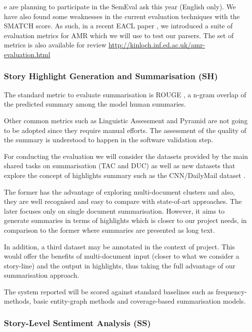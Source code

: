 e are  planning to participate in the SemEval ask this year (English only).
We have also found some weaknesses in the current evaluation techniques with the SMATCH score. As such, in a recent EACL paper \citep{damonte-17}, we introduced a suite of evaluation metrics for AMR which we will use to test our parsers. The set of metrics is also available for review 
\url{http://kinloch.inf.ed.ac.uk/amr-evaluation.html}

\subsubsection{Story Highlight Generation and Summarisation (SH)}

The standard metric to evaluate summarisation is ROUGE \citep{Lin04ROUGE}, a n-gram overlap of the predicted summary among the model human summaries.

Other common metrics such as Linguistic Assessment and Pyramid \citep{Nenkova07Pyramid} are not going to be adopted since they require manual efforts. The assessment of the quality of the summary is understood to happen in the software validation step.

For conducting the evaluation we will consider the datasets provided by the main shared tasks on summarisation (TAC and DUC) as well as new datasets that explore the concept of highlights summary such as the CNN/DailyMail dataset \citep{ChengLapata16Neural}.

The former has the advantage of exploring multi-document clusters and also, they are well recognised and easy to compare with state-of-art approaches. The later focuses only on single document summarisation. However, it aims to generate summaries in terms of highlights which is closer to our project needs, in comparison to the former where summaries are presented as long text. 

In addition, a third dataset may be annotated in the context of \SUMMA project. This would offer the benefits of multi-document input (closer to what we consider a story-line) and the output in highlights, thus taking the full advantage of our summarisation approach.

The system reported will be scored against standard baselines such as frequency-methods, basic entity-graph methods and coverage-based summarisation models.


\subsubsection{Story-Level Sentiment Analysis (SS)}

